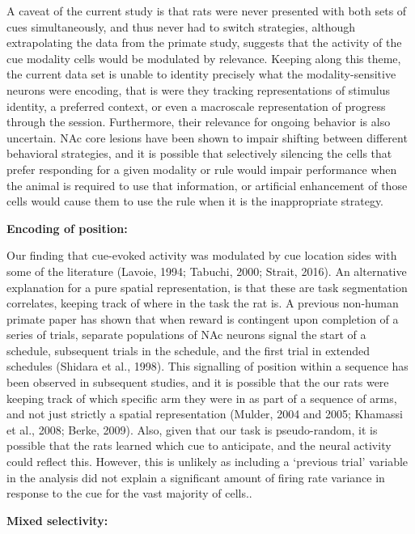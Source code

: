 \documentclass[11pt]{article}
\begin{document}
A caveat of the current study is that rats were never presented with both sets of cues simultaneously, and thus never had to switch strategies, although extrapolating the data from the primate study, suggests that the activity of the cue modality cells would be modulated by relevance. Keeping along this theme, the current data set is unable to identity precisely what the modality-sensitive neurons were encoding, that is were they tracking representations of stimulus identity, a preferred context, or even a macroscale representation of progress through the session. Furthermore, their relevance for ongoing behavior is also uncertain. NAc core lesions have been shown to impair shifting between different behavioral strategies, and it is possible that selectively silencing the cells that prefer responding for a given modality or rule would impair performance when the animal is required to use that information, or artificial enhancement of those cells would cause them to use the rule when it is the inappropriate strategy.  

{\bf Encoding of position:} 

Our finding that cue-evoked activity was modulated by cue location sides with some of the literature (Lavoie, 1994; Tabuchi, 2000; Strait, 2016). An alternative explanation for a pure spatial representation, is that these are task segmentation correlates, keeping track of where in the task the rat is. A previous non-human primate paper has shown that when reward is contingent upon completion of a series of trials, separate populations of NAc neurons signal the start of a schedule, subsequent trials in the schedule, and the first trial in extended schedules (Shidara et al., 1998). This signalling of position within a sequence has been observed in subsequent studies, and it is possible that the our rats were keeping track of which specific arm they were in as part of a sequence of arms, and not just strictly a spatial representation (Mulder, 2004 and 2005; Khamassi et al., 2008; Berke, 2009). Also, given that our task is pseudo-random, it is possible that the rats learned which cue to anticipate, and the neural activity could reflect this. However, this is unlikely as including a ‘previous trial’ variable in the analysis did not explain a significant amount of firing rate variance in response to the cue for the vast majority of cells..

{\bf Mixed selectivity:} 
\end{document}
